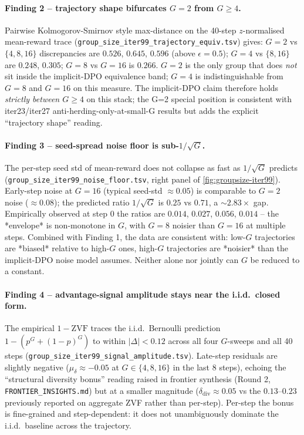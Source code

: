 \paragraph{Finding 2 -- trajectory shape bifurcates $G{=}2$ from $G{\ge}4$.}
Pairwise Kolmogorov-Smirnov style max-distance on the 40-step
$z$-normalised mean-reward trace
(\texttt{group\_size\_iter99\_trajectory\_equiv.tsv}) gives:
$G{=}2$ vs $\{4,8,16\}$ discrepancies are $0.526$, $0.645$, $0.596$
(above $\epsilon{=}0.5$); $G{=}4$ vs $\{8,16\}$ are $0.248$, $0.305$;
$G{=}8$ vs $G{=}16$ is $0.266$.  $G{=}2$ is the only group that does
\emph{not} sit inside the implicit-DPO equivalence band; $G{=}4$ is
indistinguishable from $G{=}8$ and $G{=}16$ on this measure.
The implicit-DPO claim therefore holds \emph{strictly between
$G{\ge}4$} on this stack; the G=2 special position is consistent
with iter23/iter27 anti-herding-only-at-small-G results but adds
the explicit ``trajectory shape'' reading.

\paragraph{Finding 3 -- seed-spread noise floor is sub-$1/\sqrt{G}$.}
The per-step seed std of mean-reward does not collapse as fast as
$1/\sqrt{G}$ predicts
(\texttt{group\_size\_iter99\_noise\_floor.tsv}, right panel of
\autoref{fig:groupsize-iter99}).  Early-step noise at $G{=}16$
(typical seed-std $\approx 0.05$) is comparable to $G{=}2$ noise
($\approx 0.08$); the predicted ratio $1/\sqrt{G}$ is $0.25$ vs
$0.71$, a $\sim 2.83\times$ gap.  Empirically observed at step 0 the
ratios are $0.014$, $0.027$, $0.056$, $0.014$ -- the *envelope*
is non-monotone in $G$, with $G{=}8$ noisier than $G{=}16$ at
multiple steps.  Combined with Finding 1, the data are consistent
with: low-$G$ trajectories are *biased* relative to high-$G$ ones,
high-$G$ trajectories are *noisier* than the implicit-DPO noise
model assumes.  Neither alone nor jointly can $G$ be reduced to a
constant.

\paragraph{Finding 4 -- advantage-signal amplitude stays near the i.i.d.\ closed form.}
The empirical $1-\mathrm{ZVF}$ traces the i.i.d.\ Bernoulli prediction
$1 - (p^G + (1-p)^G)$ to within $|{\Delta}|<0.12$ across all four
$G$-sweeps and all 40 steps
(\texttt{group\_size\_iter99\_signal\_amplitude.tsv}).  Late-step
residuals are slightly negative ($\mu_\delta \approx -0.05$ at
$G{\in}\{4,8,16\}$ in the last 8 steps), echoing the
``structural diversity bonus'' reading raised in frontier
synthesis (Round 2, \texttt{FRONTIER\_INSIGHTS.md}) but at a
smaller magnitude ($\delta_\mathrm{div}\approx 0.05$ vs the
$0.13$--$0.23$ previously reported on aggregate ZVF rather than per-step).
Per-step the bonus is fine-grained and step-dependent: it does not
unambiguously dominate the i.i.d.\ baseline across the trajectory.

